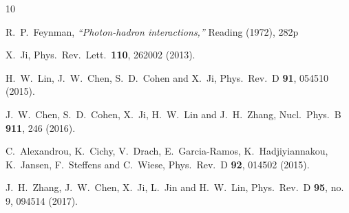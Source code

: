 \documentclass[aps,prd,twocolumn,showpacs,preprintnumbers,superscriptaddress,groupedaddress]{revtex4-1}
\begin{document}
 
 \begin{thebibliography}{10}
 
 
  R.~P.~Feynman,
  {\it ``Photon-hadron interactions,''}
  Reading (1972), 282p



  X.~Ji,
  Phys.\ Rev.\ Lett.\  {\bf 110}, 262002 (2013).



  H.~W.~Lin, J.~W.~Chen, S.~D.~Cohen and X.~Ji,
  Phys.\ Rev.\ D {\bf 91}, 054510 (2015).



  J.~W.~Chen, S.~D.~Cohen, X.~Ji, H.~W.~Lin and J.~H.~Zhang,
  Nucl.\ Phys.\ B {\bf 911}, 246 (2016).



  C.~Alexandrou, K.~Cichy, V.~Drach, E.~Garcia-Ramos, K.~Hadjiyiannakou, K.~Jansen, F.~Steffens and C.~Wiese,
  Phys.\ Rev.\ D {\bf 92}, 014502 (2015).



  J.~H.~Zhang, J.~W.~Chen, X.~Ji, L.~Jin and H.~W.~Lin,
  Phys.\ Rev.\ D {\bf 95}, no. 9, 094514 (2017).




\end{thebibliography}
\end{document}
